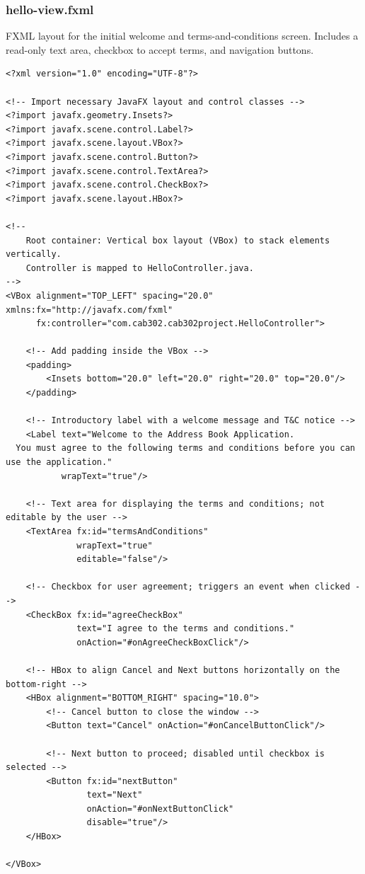 \documentclass{article}
\begin{document}
\subsubsection*{hello-view.fxml}
FXML layout for the initial welcome and terms-and-conditions screen. Includes a read-only text area, checkbox to accept terms, and navigation buttons.

\begin{verbatim}
<?xml version="1.0" encoding="UTF-8"?>

<!-- Import necessary JavaFX layout and control classes -->
<?import javafx.geometry.Insets?>
<?import javafx.scene.control.Label?>
<?import javafx.scene.layout.VBox?>
<?import javafx.scene.control.Button?>
<?import javafx.scene.control.TextArea?>
<?import javafx.scene.control.CheckBox?>
<?import javafx.scene.layout.HBox?>

<!--
    Root container: Vertical box layout (VBox) to stack elements vertically.
    Controller is mapped to HelloController.java.
-->
<VBox alignment="TOP_LEFT" spacing="20.0" xmlns:fx="http://javafx.com/fxml"
      fx:controller="com.cab302.cab302project.HelloController">

    <!-- Add padding inside the VBox -->
    <padding>
        <Insets bottom="20.0" left="20.0" right="20.0" top="20.0"/>
    </padding>

    <!-- Introductory label with a welcome message and T&C notice -->
    <Label text="Welcome to the Address Book Application.
  You must agree to the following terms and conditions before you can use the application."
           wrapText="true"/>

    <!-- Text area for displaying the terms and conditions; not editable by the user -->
    <TextArea fx:id="termsAndConditions"
              wrapText="true"
              editable="false"/>

    <!-- Checkbox for user agreement; triggers an event when clicked -->
    <CheckBox fx:id="agreeCheckBox"
              text="I agree to the terms and conditions."
              onAction="#onAgreeCheckBoxClick"/>

    <!-- HBox to align Cancel and Next buttons horizontally on the bottom-right -->
    <HBox alignment="BOTTOM_RIGHT" spacing="10.0">
        <!-- Cancel button to close the window -->
        <Button text="Cancel" onAction="#onCancelButtonClick"/>

        <!-- Next button to proceed; disabled until checkbox is selected -->
        <Button fx:id="nextButton"
                text="Next"
                onAction="#onNextButtonClick"
                disable="true"/>
    </HBox>

</VBox>
\end{verbatim}
\end{document}
